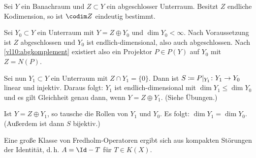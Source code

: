 \begin{thLemma}
    Sei $Y$ ein Banachraum und $Z\subset Y$ ein abgeschlosser Unterraum.
    Besitzt $Z$ endliche Kodimension, so ist $\codim Z$ eindeutig bestimmt.
\end{thLemma}

\begin{proofsketch}
    Sei $Y_0\subset Y$ ein Unterraum mit $Y = Z\oplus Y_0$ und $\dim Y_0 <
    \infty$.  Nach Voraussetzung ist $Z$ abgeschlossen und $Y_0$ ist
    endlich-dimensional, also auch abgeschlossen. Nach \cref{vl10:abgkomplement}
    existiert also ein Projektor $P\in P(Y)$ auf $Y_0$ mit $Z=N(P)$.
    
    Sei nun $Y_1\subset Y$ ein Unterraum mit $Z\cap Y_1 = \{0\}$. Dann ist
    $S\coloneqq P\vert_{Y_1}\colon Y_1\to Y_0$ linear und injektiv. Daraus folgt:
    $Y_1$ ist endlich-dimensional mit $\dim Y_1 \leq \dim Y_0$ und es gilt
    Gleichheit genau dann, wenn $Y = Z\oplus Y_1$.  (Siehe Übungen.)
    
    Ist $Y=Z\oplus Y_1$, so tausche die Rollen von $Y_1$ und $Y_0$. Es folgt:
    $\dim Y_1 = \dim Y_0$. (Außerdem ist dann $S$ bijektiv.)
    \\
\end{proofsketch}

\nnBemerkung Eine große Klasse von Fredholm-Operatoren ergibt sich aus
kompakten Störungen der Identität, d.\,h. $A = \Id-T$ für $T\in K(X)$.
